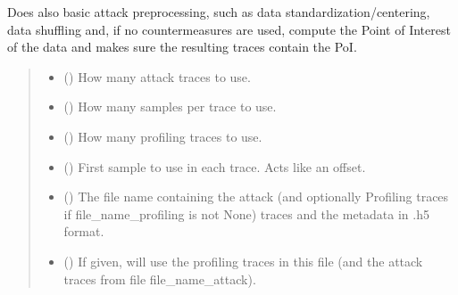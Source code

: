 \documentclass[letterpaper,10pt,english]{sphinxmanual}
\begin{document}
\begin{fulllineitems}
\begin{fulllineitems}
\sphinxAtStartPar
Does also basic attack preprocessing, such as data standardization/centering, data shuffling and,
if no countermeasures are used, compute the Point of Interest of the data and makes sure the
resulting traces contain the PoI.
\begin{quote}\begin{description}
\begin{itemize}
\item {} 
\sphinxAtStartPar
{} (\sphinxstyleliteralemphasis{\sphinxupquote{, }}) \textendash{} How many attack traces to use.

\item {} 
\sphinxAtStartPar
{} (\sphinxstyleliteralemphasis{\sphinxupquote{, }}) \textendash{} How many samples per trace to use.

\item {} 
\sphinxAtStartPar
{} (\sphinxstyleliteralemphasis{\sphinxupquote{, }}) \textendash{} How many profiling traces to use.

\item {} 
\sphinxAtStartPar
{} (\sphinxstyleliteralemphasis{\sphinxupquote{, }}) \textendash{} First sample to use in each trace. Acts like an offset.

\item {} 
\sphinxAtStartPar
{} () \textendash{} The file name containing the attack (and optionally Profiling traces if file\_name\_profiling is not None)
traces and the metadata in .h5 format.

\item {} 
\sphinxAtStartPar
{} (\sphinxstyleliteralemphasis{\sphinxupquote{, }}) \textendash{} If given, will use the profiling traces in this file (and the attack traces from file file\_name\_attack).


\end{itemize}
\end{description}
\end{quote}
\end{fulllineitems}
\end{fulllineitems}
\end{document}
